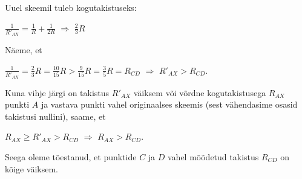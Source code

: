 {\begin{center}
\end{center}
Uuel skeemil tuleb kogutakistuseks:
\begin{center}
$\frac{1}{R'_{AX}} = \frac{1}{R} + \frac{1}{2R}$  $\Rightarrow$ $\frac{2}{3} R$
\end{center}
Näeme, et
\begin{center}
$\frac{1}{R'_{AX}} = \frac{2}{3} R =\frac{10}{15} R > \frac{9}{15}R = \frac{3}{5}R = R_{CD}$ $\Rightarrow$ $R'_{AX} > R_{CD}$.
\end{center}
Kuna vihje järgi on takistus $R'_{AX}$ väiksem või võrdne kogutakistusega $R_{AX}$ punkti $A$ ja vastava punkti vahel originaalses skeemis (sest vähendasime osasid takistusi nullini), saame, et 
\begin{center}
$R_{AX} \geq R'_{AX} > R_{CD}$ $\Rightarrow$ $R_{AX} > R_{CD}$.
\end{center}
Seega oleme tõestanud, et punktide $C$ ja $D$ vahel mõõdetud takistus $R_{CD}$ on kõige väiksem.
\fi
}